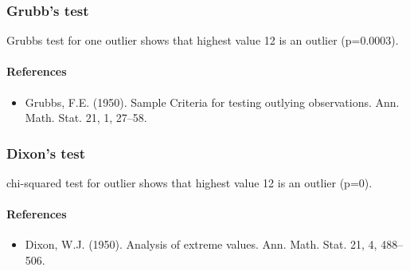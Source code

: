 \documentclass{article}
\begin{document}
\subsubsection{Grubb's test}

Grubbs test for one outlier shows that highest value 12 is an outlier
(p=0.0003).

\paragraph{References}

\begin{itemize}
\item
  Grubbs, F.E. (1950). Sample Criteria for testing outlying
  observations. Ann. Math. Stat. 21, 1, 27--58.
\end{itemize}
\subsubsection{Dixon's test}

chi-squared test for outlier shows that highest value 12 is an outlier
(p=0).

\paragraph{References}

\begin{itemize}
\item
  Dixon, W.J. (1950). Analysis of extreme values. Ann. Math. Stat. 21,
  4, 488--506.
\end{itemize}
\end{document}
